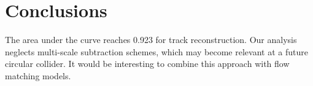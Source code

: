 \section{Conclusions}\label{sec:conclusions}

The area under the curve reaches 0.923 for track reconstruction. Our
analysis neglects multi-scale subtraction schemes, which may become
relevant at a future circular collider. It would be interesting to
combine this approach with flow matching models.


